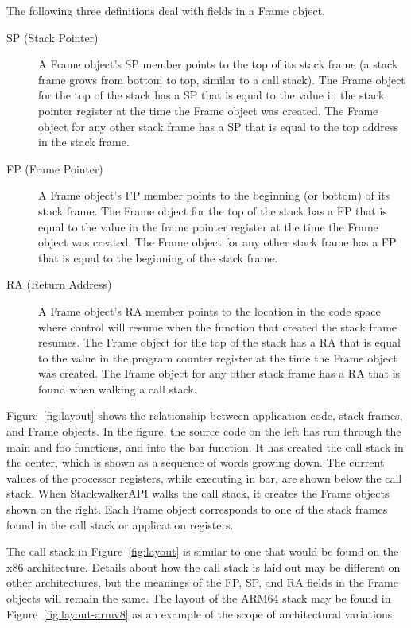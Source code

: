 The following three definitions deal with fields in a Frame object. 
\begin{description}

\item [SP (Stack Pointer)] A Frame object's SP member points to the top of its
    stack frame (a stack frame grows from bottom to top, similar to a call
    stack). The Frame object for the top of the stack has a SP that is equal to
    the value in the stack pointer register at the time the Frame object was
    created. The Frame object for any other stack frame has a SP that is equal
    to the top address in the stack frame. 

\item [FP (Frame Pointer)] A Frame object's FP member points to the beginning
    (or bottom) of its stack frame. The Frame object for the top of the stack
    has a FP that is equal to the value in the frame pointer register at the
    time the Frame object was created. The Frame object for any other stack
    frame has a FP that is equal to the beginning of the stack frame.
    
\item [RA (Return Address)] A Frame object's RA member points to the location in
    the code space where control will resume when the function that created the
    stack frame resumes. The Frame object for the top of the stack has a RA that
    is equal to the value in the program counter register at the time the Frame
    object was created.  The Frame object for any other stack frame has a RA
    that is found when walking a call stack.

\end{description}




Figure~\ref{fig:layout} shows the relationship between application code, stack
frames, and Frame objects. In the figure, the source code on the left has run
through the main and foo functions, and into the bar function. It has created
the call stack in the center, which is shown as a sequence of words growing
down. The current values of the processor registers, while executing in bar, are
shown below the call stack. When StackwalkerAPI walks the call stack, it creates
the Frame objects shown on the right. Each Frame object corresponds to one of
the stack frames found in the call stack or application registers.  

The call stack in Figure~\ref{fig:layout} is similar to one that would be found
on the x86 architecture. Details about how the call stack is laid out may be
different on other architectures, but the meanings of the FP, SP, and RA fields
in the Frame objects will remain the same. The layout of the ARM64 stack may be found in Figure~\ref{fig:layout-armv8} as an example of the scope of architectural variations.


